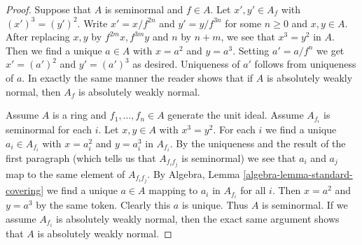 \documentclass[10pt,a4paper]{amsart}
\theoremstyle{plain}
\theoremstyle{definition}
\theoremstyle{remark}
\numberwithin{equation}{subsection}
\begin{document}
\begin{proof}
Suppose that $A$ is seminormal and $f \in A$. Let $x', y' \in A_f$
with $(x')^3 = (y')^2$. Write $x' = x/f^{2n}$ and $y' = y/f^{3n}$
for some $n \geq 0$ and $x, y \in A$. After replacing $x, y$
by $f^{2m}x, f^{3m}y$ and $n$ by $n + m$, we see that
$x^3 = y^2$ in $A$. Then we find a unique $a \in A$ with
$x = a^2$ and $y = a^3$. Setting $a' = a/f^n$ we get
$x' = (a')^2$ and $y' = (a')^3$ as desired. Uniqueness
of $a'$ follows from uniqueness of $a$.
In exactly the same manner the reader shows that if $A$ is
absolutely weakly normal,
then $A_f$ is absolutely weakly normal.

\medskip\noindent
Assume $A$ is a ring and $f_1, \ldots, f_n \in A$ generate the unit
ideal. Assume $A_{f_i}$ is seminormal for each $i$.
Let $x, y \in A$ with $x^3 = y^2$. For each $i$ we find a unique
$a_i \in A_{f_i}$ with $x = a_i^2$ and $y = a_i^3$ in $A_{f_i}$.
By the uniqueness and the result of the first paragraph (which
tells us that $A_{f_if_j}$ is seminormal) we see that
$a_i$ and $a_j$ map to the same element of $A_{f_if_j}$.
By Algebra, Lemma \ref{algebra-lemma-standard-covering}
we find a unique $a \in A$
mapping to $a_i$ in $A_{f_i}$ for all $i$.
Then $x = a^2$ and $y = a^3$ by the same token. Clearly this $a$ is unique.
Thus $A$ is seminormal. If we assume $A_{f_i}$ is absolutely weakly normal,
then the exact same argument shows that $A$ is absolutely weakly normal.
\end{proof}
\end{document}
